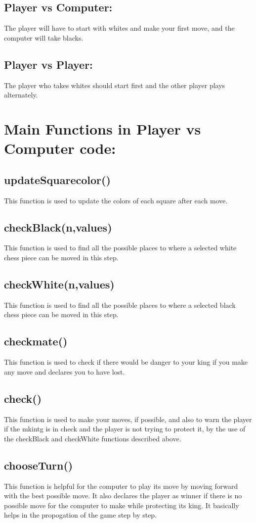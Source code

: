 \documentclass{article}
\begin{document}
\subsection{Player vs Computer:}
The player will have to start with whites and make your first move, and the computer will take blacks.

\subsection{Player vs Player:}
The player who takes whites should start first and the other player plays alternately.\\



\section{Main Functions in Player vs Computer code:}
\subsection{updateSquarecolor()}
This function is used to update the colors of each square after each move.
\subsection{checkBlack(n,values)}
This function is used to find all the possible places to where a selected white chess piece can be moved in this step.
\subsection{checkWhite(n,values)}
This function is used to find all the possible places to where a selected black chess piece can be moved in this step.
\subsection{checkmate()}
This function is used to check if there would be danger to your king if you make any move and declares you to have lost.
\subsection{check()}
This function is used to make your moves, if possible, and also to warn the player if the mkintg is in check and the player is not trying to protect it, by the use of the checkBlack and checkWhite functions described above.
\subsection{chooseTurn()}
This function is helpful for the computer to play its move by moving forward with the best possible move. It also declares the player as winner if there is no possible move for the computer to make while protecting its king. It basically helps in the propogation of the game step by step.
\end{document}
